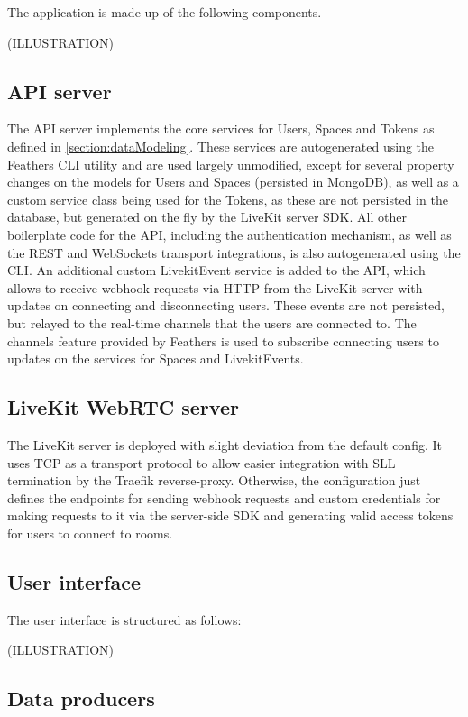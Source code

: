 The application is made up of the following components.

(ILLUSTRATION)


\subsection{API server}

The \ac{API} server implements the core services for Users, Spaces and Tokens as defined in \autoref{section:dataModeling}. These services are autogenerated using the Feathers \ac{CLI} utility and are used largely unmodified, except for several property changes on the models for Users and Spaces (persisted in MongoDB), as well as a custom service class being used for the Tokens, as these are not persisted in the database, but generated on the fly by the LiveKit server \ac{SDK}. All other boilerplate code for the \ac{API}, including the authentication mechanism, as well as the REST and WebSockets transport integrations, is also autogenerated using the \ac{CLI}. An additional custom LivekitEvent service is added to the API, which allows to receive webhook requests via HTTP from the LiveKit server with updates on connecting and disconnecting users. These events are not persisted, but relayed to the real-time channels that the users are connected to. The channels feature provided by Feathers is used to subscribe connecting users to updates on the services for Spaces and LivekitEvents.

\subsection{LiveKit WebRTC server}

The LiveKit server is deployed with slight deviation from the default config. It uses TCP as a transport protocol to allow easier integration with SLL termination by the Traefik reverse-proxy. Otherwise, the configuration just defines the endpoints for sending webhook requests and custom credentials for making requests to it via the server-side \ac{SDK} and generating valid access tokens for users to connect to rooms.

\subsection{User interface}

The user interface is structured as follows:

(ILLUSTRATION)

\subsection{Data producers}

